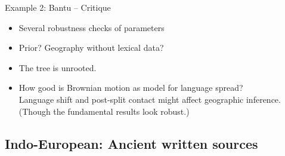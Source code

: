 \documentclass[9pt]{beamer}
\begin{document}
\begin{frame}{Example 2: Bantu – Critique}
  \begin{itemize}
  \item Several robustness checks of parameters
  \item Prior? Geography without lexical data?
  \item The tree is unrooted.
  \item How good is Brownian motion as model for language spread?\\
    Language shift and post-split contact might affect geographic
    inference. (Though the fundamental results look robust.)
  \end{itemize}
\end{frame}
\subsection{Indo-European: Ancient written sources}
\end{document}
